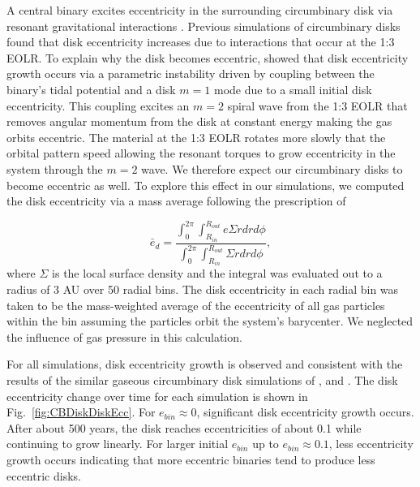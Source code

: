 A central binary excites eccentricity in the surrounding
circumbinary disk via resonant gravitational interactions
\citep{Papaloizou2001,Artymowicz1996a}.  Previous simulations of circumbinary
disks \citep{Kley2008,Papaloizou2001,Pierens2007,Pierens2013} found
that disk eccentricity increases due to interactions that occur at
the 1:3 EOLR.  To explain why the disk becomes eccentric, \citet{Papaloizou2001} showed that disk eccentricity growth occurs via a parametric instability driven by coupling between the binary's tidal potential and a disk $m = 1$ mode due to a small initial disk eccentricity.  This coupling excites an $m = 2$ spiral wave from the 1:3 EOLR that removes angular momentum from the disk at constant energy making the gas orbits eccentric.  The material at the 1:3 EOLR rotates more slowly that the orbital pattern speed allowing the resonant torques to grow eccentricity in the system through the $m = 2$ wave.  We therefore expect our circumbinary disks to become eccentric as well.  To explore this effect in our simulations, we computed the disk eccentricity via a mass average following the prescription of \citet{Pierens2007}

\begin{equation}
\bar{e}_d = \frac{\int_0^{2 \pi} \int^{R_{out}}_{R_{in}} e \Sigma r dr d\phi }{\int_0^{2 \pi} \int^{R_{out}}_{R_{in}} \Sigma r dr d\phi},
\end{equation}
where $\Sigma$ is the local surface density and the integral was
evaluated out to a radius of 3 AU over 50 radial bins.  The disk eccentricity in each radial bin was taken to be the mass-weighted average of the eccentricity of all gas particles within the bin assuming the particles orbit the system's barycenter.  We neglected the influence of gas pressure in this calculation.

For all simulations, disk eccentricity growth is observed and consistent with the results
of the similar gaseous circumbinary disk simulations of \citet{Kley2008}, \citet{Pierens2007,Pierens2013} and \citet{Farris2014}.  The disk eccentricity 
change over time for each simulation is shown in Fig.~\ref{fig:CBDiskDiskEcc}. For $e_{bin} \approx 0$, significant disk eccentricity growth occurs.  
After about 500 years, the disk reaches eccentricities of about 0.1 while continuing to grow linearly.  For larger initial $e_{bin}$ up 
to $e_{bin} \approx 0.1$, less eccentricity growth occurs indicating that more eccentric binaries tend to produce less eccentric disks.

